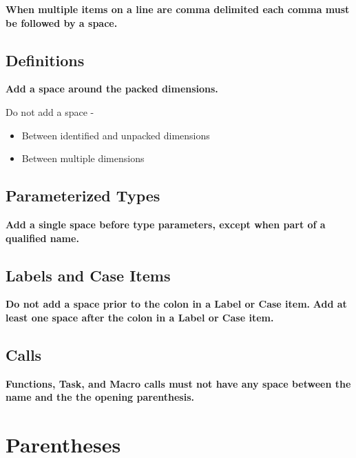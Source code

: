       \textbf{When multiple items on a line are comma delimited each comma must be followed by a space.}


    \subsection{Definitions}
    \label{systemverilog_conventions:spacing:definitions}

      \textbf{Add a space around the packed dimensions.}

      Do not add a space -
      \begin{itemize}
        \item Between identified and unpacked dimensions
        \item Between multiple dimensions
      \end{itemize}


    \subsection{Parameterized Types}
    \label{systemverilog_conventions:spacing:parameterized_types}

      \textbf{Add a single space before type parameters, except when part of a qualified name.}


    \subsection{Labels and Case Items}
    \label{systemverilog_conventions:spacing:labels_and_case_items}

      \textbf{Do not add a space prior to the colon in a Label or Case item.}
      \textbf{Add at least one space after the colon in a Label or Case item.}


    \subsection{Calls}
    \label{systemverilog_conventions:spacing:calls}

      \textbf{Functions, Task, and Macro calls must not have any space between the name and the the opening parenthesis.}

  \section{Parentheses}
  \label{systemverilog_conventions:parentheses}

